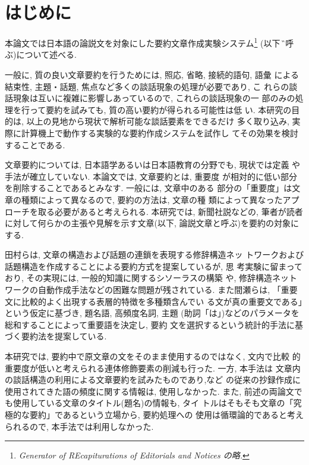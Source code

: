 

\maketitle


\section{はじめに}

本論文では日本語の論説文を対象にした要約文章作成実験システム\G
\footnote{\sl Generator of REcapiturations of Editorials and Notices
 の略. } (以下 \G と呼ぶ)について述べる. 

一般に, 質の良い文章要約を行うためには, 照応, 省略, 接続的語句, 語彙
による結束性, 主題・話題, 焦点など多くの談話現象の処理が必要であり, こ
れらの談話現象は互いに複雑に影響しあっているので, これらの談話現象の一
部のみの処理を行って要約を試みても, 質の高い要約が得られる可能性は低
い. 本研究の目的は, 以上の見地から現状で解析可能な談話要素をできるだけ
多く取り込み, 実際に計算機上で動作する実験的な要約作成システムを試作し
てその効果を検討することである. 

文章要約については, 日本語学あるいは日本語教育の分野でも, 現状では定義
や手法が確立していない\cite{要約本}. 本論文では, 文章要約とは, 重要度
が相対的に低い部分を削除することであるとみなす. 一般には, 文章中のある
部分の「重要度」は文章の種類によって異なるので, 要約の方法は, 文章の種
類によって異なったアプローチを取る必要があると考えられる. 本研究では, 
新聞社説などの, 筆者が読者に対して何らかの主張や見解を示す文章(以下, 
論説文章と呼ぶ)を要約の対象にする. 

田村ら\cite{田村}は, 文章の構造および話題の連鎖を表現する修辞構造ネッ
トワークおよび話題構造を作成することによる要約方式を提案しているが, 思
考実験に留まっており, その実現には, 一般的知識に関するシソーラスの構築
や, 修辞構造ネットワークの自動作成手法などの困難な問題が残されている.
 また間瀬らは, 「重要文に比較的よく出現する表層的特徴を多種類含んでい
る文が真の重要文である」という仮定に基づき, 題名語, 高頻度名詞, 主題
(助詞「は」)などのパラメータを総和することによって重要語を決定し, 要約
文を選択するという統計的手法に基づく要約法を提案している\cite{杉江}.

本研究では, 要約中で原文章の文をそのまま使用するのではなく, 文内で比較
的重要度が低いと考えられる連体修飾要素の削減も行った. 一方, 本手法は
文章内の談話構造の利用による文章要約を試みたものであり,\cite{杉江}など
の従来の抄録作成に使用されてきた語の頻度に関する情報は, 使用しなかった.
 また, 前述の両論文でも使用している文章のタイトル(題名)の情報も, タイ
トルはそもそも文章の「究極的な要約」であるという立場から, 要約処理への
使用は循環論的であると考えられるので, 本手法では利用しなかった.

